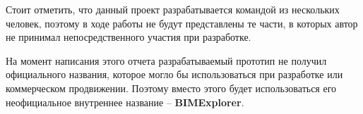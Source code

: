 Стоит отметить, что данный проект разрабатывается командой из нескольких человек,
поэтому в ходе работы не будут представлены те части,
в которых автор не принимал непосредственного участия при разработке.

На момент написания этого отчета разрабатываемый прототип не получил
официального названия, которое могло бы использоваться при разработке
или коммерческом продвижении. Поэтому вместо этого будет использоваться
его неофициальное внутреннее название -- {\bf BIMExplorer}.